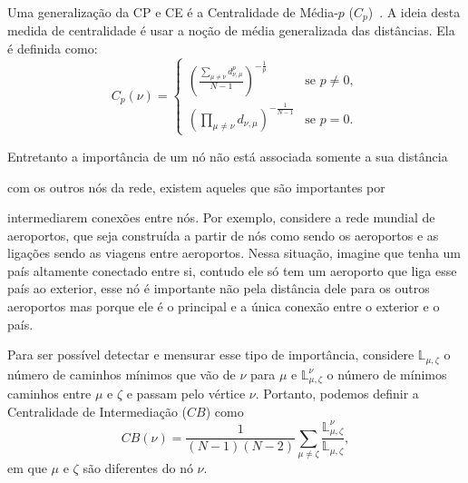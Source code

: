 Uma generalização da CP e CE é a Centralidade de
Média-$p$ ($C_p$)~\cite{Andrade2019}. A ideia desta medida de centralidade é usar a noção de média
generalizada das distâncias. Ela é definida como:
\begin{equation}
  C_p(\nu) = 
  \begin{cases}
    \left(\frac{\sum\limits_{\mu \neq \nu } d_{\nu,\mu}^p}{N - 1}\right)^{-\frac{1}{p}} &\text{se $p \neq 0$},\\
    \left(\prod\limits_{\mu \neq \nu} d_{\nu,\mu}\right)^{-\frac{1}{N - 1}} &\text{se }p = 0.
  \end{cases}
\end{equation}

Entretanto a importância de um nó não está associada somente a sua distância 

com os outros nós da rede, existem aqueles que são importantes por 

intermediarem
conexões entre nós. Por exemplo,
considere a rede mundial
de 
aeroportos, que seja construída a partir de nós como sendo os aeroportos e as ligações sendo as viagens entre aeroportos. Nessa situação, imagine que tenha um país altamente conectado entre si, contudo ele só tem um aeroporto que liga esse país ao exterior, esse nó é importante não pela distância dele para os outros aeroportos mas porque ele é o principal e 
a única conexão
entre o exterior e o país.

Para ser possível detectar e mensurar esse tipo de importância, considere
$\mathbb{L}_{\mu,\zeta}$ o número de caminhos mínimos que vão de $\nu$ para $\mu$ e 
$\mathbb{L}^{\nu}_{\mu,\zeta}$ 
o número de mínimos caminhos entre $\mu$ e $\zeta$ e passam pelo vértice
$\nu$. Portanto, podemos definir a Centralidade de Intermediação ($CB$) como
\begin{equation}
  CB(\nu) = \frac{1}{(N - 1)(N - 2)} \sum\limits_{\mu \neq \zeta} \frac{\mathbb{L}^{\nu}_{\mu,\zeta}}{\mathbb{L}_{\mu,\zeta}},
\end{equation}
em que $\mu$ e $\zeta$ são diferentes do nó $\nu$.

